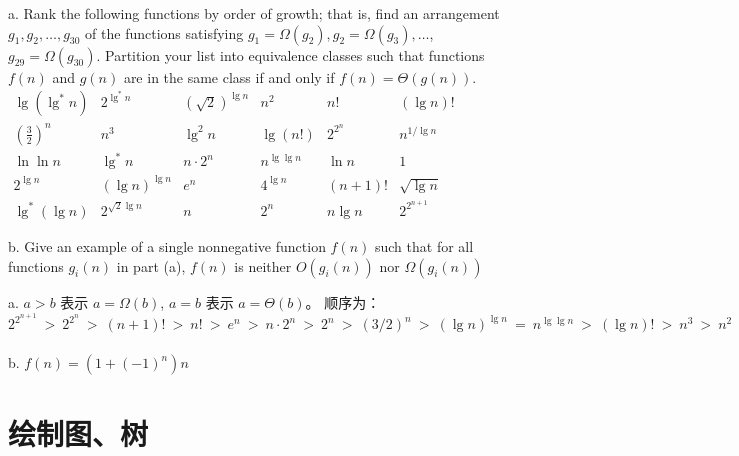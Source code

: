 \documentclass{gjm_hw}
\begin{document}
    \begin{problem}
    a. Rank the following functions by order of growth; that is, find an arrangement $g_{1}, g_{2}, \ldots, g_{30}$ of the functions satisfying $g_{1}=\Omega\left(g_{2}\right), g_{2}=\Omega\left(g_{3}\right), \ldots$, $g_{29}=\Omega\left(g_{30}\right)$. Partition your list into equivalence classes such that functions $f(n)$ and $g(n)$ are in the same class if and only if $f(n)=\Theta(g(n))$.
    $\begin{array}{cccccc}\lg \left(\lg ^{*} n\right) & 2^{\lg ^{*} n} & (\sqrt{2})^{\lg n} & n^{2} & n ! & (\lg n) ! \\ \left(\frac{3}{2}\right)^{n} & n^{3} & \lg ^{2} n & \lg (n !) & 2^{2^{n}} & n^{1 / \lg n} \\ \ln \ln n & \lg ^{*} n & n \cdot 2^{n} & n^{\lg \lg n} & \ln n & 1 \\ 2^{\lg n} & (\lg n)^{\lg n} & e^{n} & 4^{\lg n} & (n+1) ! & \sqrt{\lg n} \\ \lg ^{*}(\lg n) & 2^{\sqrt{2} \lg n} & n & 2^{n} & n \lg n & 2^{2^{n+1}}\end{array}$\par
    \vspace{1em}
    b. Give an example of a single nonnegative function $f(n)$ such that for all functions $g_{i}(n)$ in part (a), $f(n)$ is neither $O\left(g_{i}(n)\right)$ nor $\Omega\left(g_{i}(n)\right)$ \par
    \begin{solution}
    
    a. $a > b$ 表示 $a = \Omega(b)$, $a = b$ 表示 $a = \Theta(b)$。
      顺序为：$2^{2^{n+1}}\ > \ 2^{2^n}\ >\ (n+1)!\ >\ n!\ >\ e^n\ >\ 
      n\cdot 2^n\ >\ 2^n\ >\ (3/2)^n\ >\ (\lg n)^{\lg n}\ =\ n^{\lg\lg n}\ >\ 
      (\lg n)!\ >\ n^3\ >\ 
      n^2\ =\ 4^{\lg n}\ >\ n\ln n\ =\ \lg n!\ >\ n\ =\ 2^{\lg n}\ >\ 
      (\sqrt{2})^{\lg n}\ >\ 2^{\sqrt{2\lg n}}\ >\ \lg^2 n\ >\ 
      \ln n\ >\ \sqrt{\lg n}\ >\ \ln\ln n\ >\ 2^{\ln^* n}\ >\ \lg^*n\ =\ \lg^*(\lg n)\ >\ \lg(\lg^* n)
      \ >\ n^{1/\lg n}\ =\ 1$
    
    b. $f(n)=\left(1+(-1)^{n}\right) n$
    \end{solution}
    \end{problem}
    
  \section{绘制图、树}
  
\end{document}
